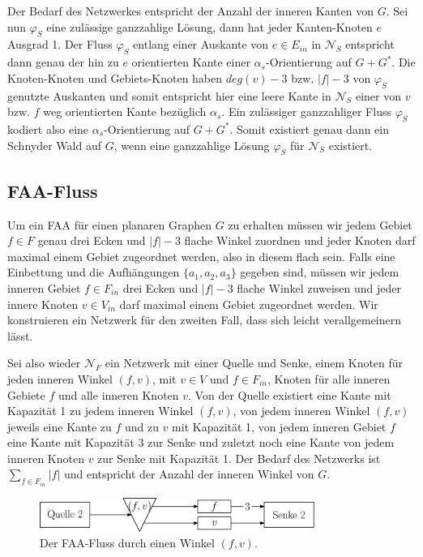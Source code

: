 Der Bedarf des Netzwerkes entspricht der Anzahl der inneren Kanten von $G$. Sei nun $\varphi_S$ eine zulässige ganzzahlige Lösung, dann hat jeder Kanten-Knoten $e$ Ausgrad 1. Der Fluss $\varphi_S$ entlang einer Auskante von $e \in E_{in}$ in $\mathcal{N}_S$ entspricht dann genau der hin zu $e$ orientierten Kante einer $\alpha_{s}$-Orientierung auf $G+G^*$. Die Knoten-Knoten und Gebiets-Knoten haben $deg(v)-3$ bzw. $|f|-3$ von $\varphi_S$ genutzte Auskanten und somit entspricht hier eine leere Kante in $\mathcal{N}_S$ einer von $v$ bzw. $f$ weg orientierten Kante bezüglich $\alpha_{s}$. Ein zulässiger ganzzahliger Fluss $\varphi_S$ kodiert also eine $\alpha_s$-Orientierung auf $G+G^*$. Somit existiert genau dann ein Schnyder Wald auf $G$, wenn eine ganzzahlige Lösung $\varphi_S$ für $\mathcal{N}_S$ existiert.

\subsection{FAA-Fluss}\label{faa-flow}

Um ein FAA für einen planaren Graphen $G$ zu erhalten müssen wir jedem Gebiet $f \in F$ genau drei Ecken und $|f|-3$ flache Winkel zuordnen und jeder Knoten darf maximal einem Gebiet zugeordnet werden, also in diesem flach sein. Falls eine Einbettung und die Aufhängungen $\{a_1,a_2,a_3\}$ gegeben sind, müssen wir jedem inneren Gebiet $f \in F_{in}$ drei Ecken und $|f|-3$ flache Winkel zuweisen und jeder innere Knoten $v \in V_{in}$ darf maximal einem Gebiet zugeordnet werden. Wir konstruieren ein Netzwerk für den zweiten Fall, dass sich leicht verallgemeinern lässt.\

Sei also wieder $\mathcal{N}_F$ ein Netzwerk mit einer Quelle und Senke, einem Knoten für jeden inneren Winkel $(f,v)$, mit $v\in V$ und $f \in F_{in}$, Knoten für alle inneren Gebiete $f$ und alle inneren Knoten $v$. Von der Quelle existiert eine Kante mit Kapazität 1 zu jedem inneren Winkel $(f,v)$, von jedem inneren Winkel $(f,v)$ jeweils eine Kante zu $f$ und zu $v$ mit Kapazität 1, von jedem inneren Gebiet $f$ eine Kante mit Kapazität 3 zur Senke und zuletzt noch eine Kante von jedem inneren Knoten $v$ zur Senke mit Kapazität 1. Der Bedarf des Netzwerks ist $\sum_{f \in F_{in}}{|f|}$ und entspricht der Anzahl der inneren Winkel von $G$. 

\begin{figure}[h]
	\centering
  \includegraphics[width=0.8\textwidth]{faa_flow.png}
  \caption{Der FAA-Fluss durch einen Winkel $(f,v)$.}
  \label{faa_flow}
\end{figure}


